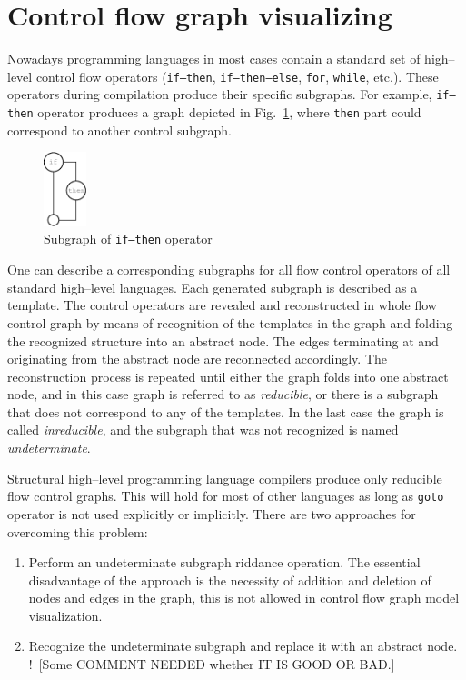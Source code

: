 \documentclass[conference]{IEEEtran}
\newcommand{\nnn}[2][ncolor]{\noindent%
\textcolor{eclr}{!\ [}\textcolor{#1}{#2}\textcolor{eclr}{]}}
\begin{document}
\section{Control flow graph visualizing}
\label{sec:cfg-vis}

Nowadays programming languages in most cases contain a standard set of high--level control flow operators (\texttt{if--then}, \texttt{if--then--else}, \texttt{for}, \texttt{while}, etc.).  These operators during compilation produce their specific subgraphs.  For example, \texttt{if--then} operator produces a graph depicted in Fig.~\ref{fig:IfSt}, where \texttt{then} part could correspond to another control subgraph.
\begin{figure}[htbp]
	\centering
		\includegraphics[width=0.11\textwidth]{Pic/Pic2.eps}
	\caption{Subgraph of \texttt{if--then} operator}
	\label{fig:IfSt}
\end{figure}

One can describe a corresponding subgraphs for all flow control operators of all standard high--level languages.  Each generated subgraph is described as a template.  The control operators are revealed and reconstructed in whole flow control graph by means of recognition of the templates in the graph and folding the recognized structure into an abstract node.  The edges terminating at and originating from the abstract node are reconnected accordingly.  The reconstruction process is repeated until either the graph folds into one abstract node, and in this case graph is referred to as \emph{reducible}, or there is a subgraph that does not correspond to any of the templates.  In the last case the graph is called \emph{inreducible}, and the subgraph that was not recognized is named \emph{undeterminate}.

Structural high--level programming language compilers produce only reducible flow control graphs.  This will hold for most of other languages as long as \texttt{goto} operator is not used explicitly or implicitly.  There are two approaches for overcoming this problem:
\begin{enumerate}
\item Perform an undeterminate subgraph riddance operation.  The essential disadvantage of the approach is the necessity of addition and deletion of nodes and edges in the graph, this is not allowed in control flow graph model visualization.
\item Recognize the undeterminate subgraph and replace it with an abstract node.  \nnn{Some COMMENT NEEDED whether IT IS GOOD OR BAD.}
\end{enumerate}
\end{document}
